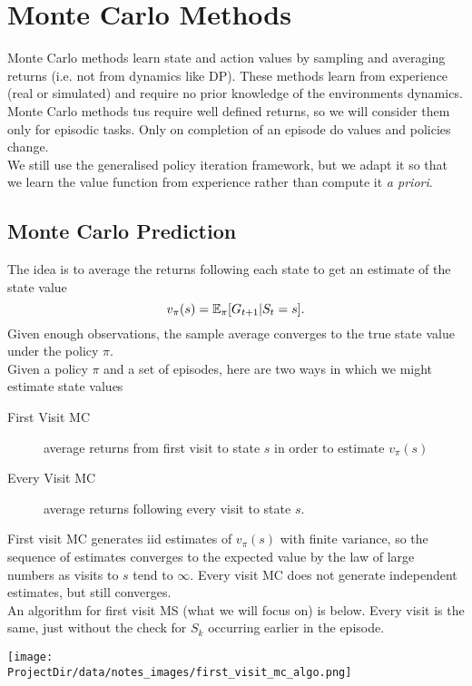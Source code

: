 
\section{Monte Carlo Methods}
Monte Carlo methods learn state and action values by sampling and averaging returns (i.e. not from dynamics like DP). These methods learn from experience (real or simulated) and require no prior knowledge of the environments dynamics.\\

Monte Carlo methods tus require well defined returns, so we will consider them only for episodic tasks. Only on completion of an episode do values and policies change.\\

We still use the generalised policy iteration framework, but we adapt it so that we learn the value function from experience rather than compute it \emph{a priori}.


\subsection{Monte Carlo Prediction}
The idea is to average the returns following each state to get an estimate of the state value
\[
    v_\pi(s) = \mathbb{E}_\pi{} [G_{t+1} | S_t =s].
\]
Given enough observations, the sample average converges to the true state value under the policy $\pi$.\\

Given a policy $\pi$ and a set of episodes, here are two ways in which we might estimate state values
\begin{description}
    \item[First Visit MC] average returns from first visit to state $s$ in order to estimate $v_\pi(s)$
    \item[Every Visit MC] average returns following every visit to state $s$.
\end{description}

First visit MC generates iid estimates of $v_\pi(s)$ with finite variance, so the sequence of estimates converges to the expected value by the law of large numbers as visits to $s$ tend to $\infty$. Every visit MC does not generate independent estimates, but still converges.\\

An algorithm for first visit MS (what we will focus on) is below. Every visit is the same, just without the check for $S_k$ occurring earlier in the episode.

\texttt{[image: \\ProjectDir/data/notes\_images/first\_visit\_mc\_algo.png]}

